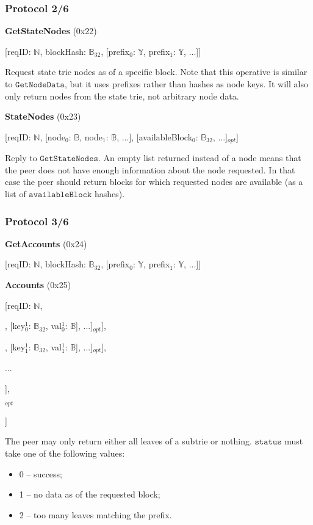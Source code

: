 \documentclass{beamer}
\begin{document}
  \begin{frame}
    \frametitle{Protocol 2/6}

    \textbf{GetStateNodes} (0x22)

    [reqID: $\mathbb{N}$, blockHash: $\mathbb{B}_{32}$,
    [prefix$_0$: $\mathbb{Y}$, prefix$_1$: $\mathbb{Y}$, ...]]
    \medskip
    
    Request state trie nodes as of a specific block.
    Note that this operative is similar to $\texttt{GetNodeData}$,
    but it uses prefixes rather than hashes as node keys.
    It will also only return nodes from the state trie,
    not arbitrary node data.

    \bigskip
    
    \textbf{StateNodes} (0x23)
    
    [reqID: $\mathbb{N}$,
    [node$_0$: $\mathbb{B}$, node$_1$: $\mathbb{B}$, ...],
    [availableBlock$_0$: $\mathbb{B}_{32}$, ...]$_{opt}$]
    \medskip
    
    Reply to $\texttt{GetStateNodes}$.
    An empty list returned instead of a node means that the peer does not have enough information about the node requested.
    In that case the peer should return blocks for which requested nodes are available
    (as a list of $\texttt{availableBlock}$ hashes).

  \end{frame}

  \begin{frame}
    \frametitle{Protocol 3/6}

    \textbf{GetAccounts} (0x24)

    [reqID: $\mathbb{N}$, blockHash: $\mathbb{B}_{32}$, [prefix$_0$: $\mathbb{Y}$, prefix$_1$: $\mathbb{Y}$, ...]]
    
    \bigskip

    \textbf{Accounts} (0x25)

[reqID: $\mathbb{N}$,

\quad [

\qquad [status$_0$: $\mathbb{N}$, [[key$^0_{0}$: $\mathbb{B}_{32}$, val$^0_{0}$: $\mathbb{B}$], [key$^1_{0}$: $\mathbb{B}_{32}$, val$^1_{0}$: $\mathbb{B}$], ...]$_{opt}$],

\qquad [status$_1$: $\mathbb{N}$, [[key$^0_{1}$: $\mathbb{B}_{32}$, val$^0_{1}$: $\mathbb{B}$], [key$^1_{1}$: $\mathbb{B}_{32}$, val$^1_{1}$: $\mathbb{B}$], ...]$_{opt}$],

\qquad ...

\quad ],

$_{opt}$

]
\medskip

The peer may only return either all leaves of a subtrie or nothing.
$\texttt{status}$ must take one of the following values:
\begin{itemize}
\item 0 -- success;
\item 1 -- no data as of the requested block;
\item 2 -- too many leaves matching the prefix.
\end{itemize}

\end{frame}
\end{document}

